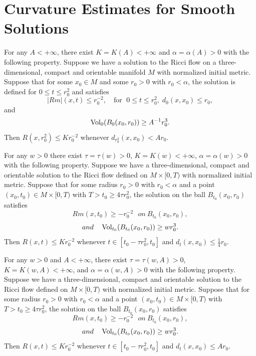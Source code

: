 \section{Curvature Estimates for Smooth Solutions}
\begin{theorem}
  \label{thm:cz-almost-euclidean-volume-curvature-control}

For any $A<+\infty$, there exist $K=K(A)<+\infty$ and
$\alpha=\alpha(A)>0$ with the following property. Suppose we have
a solution to the Ricci flow on a three-dimensional, compact and
orientable manifold $M$ with normalized initial metric. Suppose
that for some $x_0\in M$ and some $r_0>0$ with $r_0<\alpha$, the
solution is defined for $0\le t\le r_0^2$ and satisfies
$$
|Rm|(x,t)\le r_0^{-2},\quad \text{for }\; 0\le t\le
r_0^2,\;d_0(x,x_0)\le r_0,
$$
and
$$
\operatorname{Vol}_0(B_0(x_0,r_0))\ge A^{-1}r_0^3.
$$
Then $R(x,r_0^2)\le Kr_0^{-2}$ whenever $d_{r_0^2}(x,x_0)<Ar_0$.
\end{theorem}
\begin{theorem}
  \label{thm:cz-lower-volume-ratio-curvature-control}

For any $w>0$ there exist $\tau=\tau(w)>0$, $K=K(w)<+\infty$,
$\alpha=\alpha(w)>0$ with the following property. Suppose we have
a three-dimensional, compact and orientable solution to the Ricci
flow defined on $M\times[0,T)$ with normalized initial metric.
Suppose that for some radius $r_0>0$ with $r_0<\alpha$ and a point
$(x_0,t_0)\in M\times[0,T)$ with $T
> t_0\geq4\tau r^2_0$, the solution on the ball $B_{t_0}(x_0,r_0)$
satisfies
$$
Rm(x,t_0)\geq-r_0^{-2}\ \ \ on\ B_{t_0}(x_0,r_0),
$$
$$
and\ \ \ \operatorname{Vol}_{t_0}(B_{t_0}(x_0,r_0))\geq wr_0^3.
$$
Then $R(x,t)\leq Kr_0^{-2}$ whenever $t\in[t_0-\tau r^2_0,t_0]$
and $d_t(x,x_0)\leq\frac{1}{4}r_0.$
\end{theorem}
\begin{corollary}
  \label{cor:cz-localized-volume-sectional-curvature-control}

For any $w>0$ and $A<+\infty$, there exist $\tau=\tau(w,A)>0$,
$K=K(w,A)<+\infty$, and $\alpha=\alpha(w,A)>0$ with the following
property. Suppose we have a three-dimensional, compact and
orientable solution to the Ricci flow defined on $M\times[0,T)$
with normalized initial metric. Suppose that for some radius
$r_0>0$ with $r_0 <\alpha$ and a point $(x_0,t_0)\in M\times[0,T)$
with $T > t_0\geq 4\tau r^2_0$, the solution on the ball
$B_{t_0}(x_0,r_0)$ satisfies
$$
Rm(x,t_0)\geq-r_0^{-2}\ \ \ on\ B_{t_0}(x_0,r_0),
$$
$$
and\ \ \ \operatorname{Vol}_{t_0}(B_{t_0}(x_0,r_0))\geq wr_0^3.
$$
Then $R(x,t)\leq Kr_0^{-2}$ whenever $t\in[t_0-\tau r^2_0,t_0]$
and $d_t(x,x_0)\leq Ar_0.$
\end{corollary}
